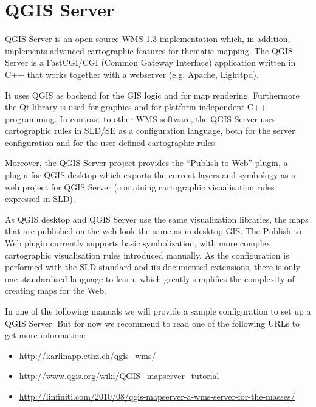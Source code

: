 
\chapter{QGIS Server}\label{label_qgisserver}

\updatedisclaimer

QGIS Server is an open source WMS 1.3 implementation which, in addition,
implements advanced cartographic features for thematic mapping. The QGIS
Server is a FastCGI/CGI (Common Gateway Interface) application written in
C++ that works together with a webserver (e.g. Apache, Lighttpd). 

It uses QGIS as backend for the GIS logic and for map rendering. Furthermore the 
Qt library is used for graphics and for platform independent 
C++ programming. In contrast to other WMS software, the QGIS Server uses 
cartographic rules in SLD/SE as a configuration language, both for the server 
configuration and for the user-defined cartographic rules. 

Moreover, the QGIS Server project provides the “Publish to Web” plugin, a 
plugin for QGIS desktop which exports the current layers and symbology as a 
web project for QGIS Server (containing cartographic visualisation rules 
expressed in SLD).

As QGIS desktop and QGIS Server use the same visualization libraries, the
maps that are published on the web look the same as in desktop GIS. The 
Publish to Web plugin currently supports basic symbolization, with more complex 
cartographic visualisation rules introduced manually. As the configuration is 
performed with the SLD standard and its documented extensions, there is only 
one standardised language to learn, which greatly simplifies the complexity 
of creating maps for the Web.

In one of the following manuals we will provide a sample configuration to 
set up a QGIS Server. But for now we recommend to read one of the following 
URLs to get more information:

\begin{itemize}
\item \url{http://karlinapp.ethz.ch/qgis\_wms/} \\
\item \url{http://www.qgis.org/wiki/QGIS\_mapserver\_tutorial} \\
\item \url{http://linfiniti.com/2010/08/qgis-mapserver-a-wms-server-for-the-masses/}
\end{itemize}


\FloatBarrier
